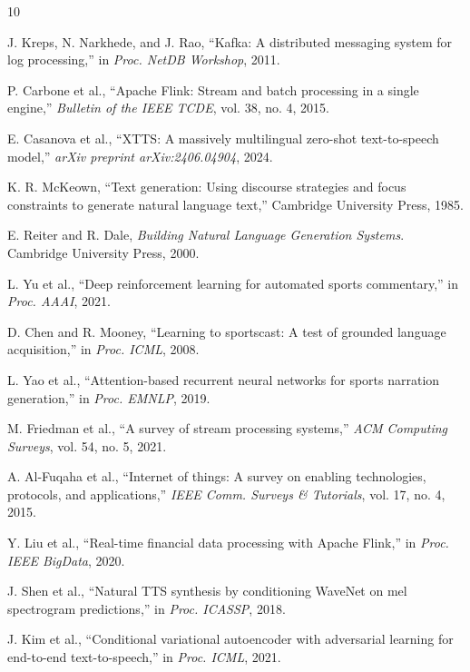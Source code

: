 \documentclass[conference]{IEEEtran}
\begin{document}
\begin{thebibliography}{10}

 J. Kreps, N. Narkhede, and J. Rao, ``Kafka: A distributed messaging system for log processing,'' in \textit{Proc. NetDB Workshop}, 2011.

 P. Carbone et al., ``Apache Flink: Stream and batch processing in a single engine,'' \textit{Bulletin of the IEEE TCDE}, vol. 38, no. 4, 2015.

 E. Casanova et al., ``XTTS: A massively multilingual zero-shot text-to-speech model,'' \textit{arXiv preprint arXiv:2406.04904}, 2024.

 K. R. McKeown, ``Text generation: Using discourse strategies and focus constraints to generate natural language text,'' Cambridge University Press, 1985.

 E. Reiter and R. Dale, \textit{Building Natural Language Generation Systems}. Cambridge University Press, 2000.

 L. Yu et al., ``Deep reinforcement learning for automated sports commentary,'' in \textit{Proc. AAAI}, 2021.

 D. Chen and R. Mooney, ``Learning to sportscast: A test of grounded language acquisition,'' in \textit{Proc. ICML}, 2008.

 L. Yao et al., ``Attention-based recurrent neural networks for sports narration generation,'' in \textit{Proc. EMNLP}, 2019.

 M. Friedman et al., ``A survey of stream processing systems,'' \textit{ACM Computing Surveys}, vol. 54, no. 5, 2021.

 A. Al-Fuqaha et al., ``Internet of things: A survey on enabling technologies, protocols, and applications,'' \textit{IEEE Comm. Surveys \& Tutorials}, vol. 17, no. 4, 2015.

 Y. Liu et al., ``Real-time financial data processing with Apache Flink,'' in \textit{Proc. IEEE BigData}, 2020.

 J. Shen et al., ``Natural TTS synthesis by conditioning WaveNet on mel spectrogram predictions,'' in \textit{Proc. ICASSP}, 2018.

 J. Kim et al., ``Conditional variational autoencoder with adversarial learning for end-to-end text-to-speech,'' in \textit{Proc. ICML}, 2021.

\end{thebibliography}
\end{document}
